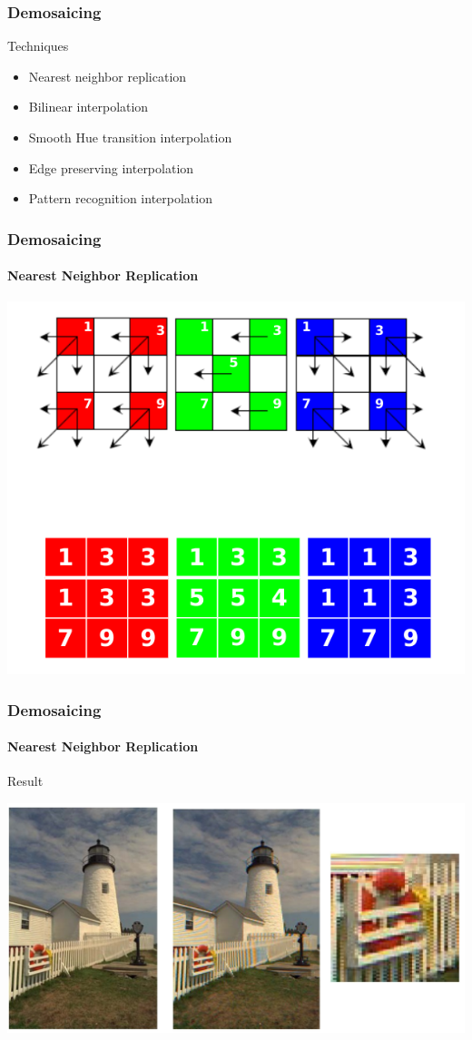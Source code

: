 \documentclass{beamer}
\begin{document}
\begin{frame}
\frametitle{Demosaicing}
\begin{block}{Techniques}
\begin{itemize}
\item Nearest neighbor replication 
\item Bilinear interpolation
\item Smooth Hue transition interpolation
\item Edge preserving interpolation
\item Pattern recognition interpolation
\end{itemize}
\end{block}
\end{frame}
\begin{frame}
\frametitle{Demosaicing}
\framesubtitle{Nearest Neighbor Replication}
\begin{center}
\includegraphics[scale=0.4]{images/L7_NN.png}
\end{center}
\end{frame}
\begin{frame}
\frametitle{Demosaicing}
\framesubtitle{Nearest Neighbor Replication}
\begin{block}{Result}
\begin{center}
\includegraphics[scale=0.35]{images/L7_res_NN.png}
\end{center}
\end{block}
\end{frame}
\end{document}
